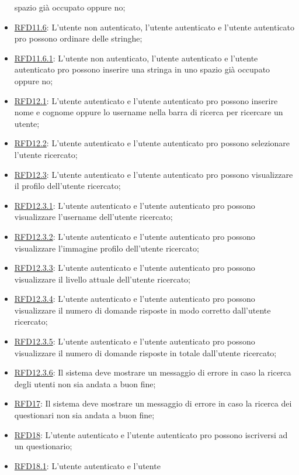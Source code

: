 \begin{itemize}
spazio già occupato oppure no;
\item \hyperlink{RFD11.6}{RFD11.6}: L’utente non autenticato, l’utente
autenticato e l’utente autenticato pro
possono ordinare delle stringhe;
\item \hyperlink{RFD11.6.1}{RFD11.6.1}: L’utente non autenticato, l’utente
autenticato e l’utente autenticato pro
possono inserire una stringa in uno spazio
già occupato oppure no;
\item \hyperlink{RFD12.1}{RFD12.1}: L’utente autenticato e l’utente
autenticato pro possono inserire nome e
cognome oppure lo username nella barra
di ricerca per ricercare un utente;
\item \hyperlink{RFD12.2}{RFD12.2}: L’utente autenticato e l’utente
autenticato pro possono selezionare
l’utente ricercato;
\item \hyperlink{RFD12.3}{RFD12.3}: L’utente autenticato e l’utente
autenticato pro possono visualizzare il profilo dell'utente ricercato;
\item \hyperlink{RFD12.3.1}{RFD12.3.1}: L’utente autenticato e l’utente autenticato pro possono visualizzare l'username dell'utente ricercato;
\item \hyperlink{RFD12.3.2}{RFD12.3.2}: L’utente autenticato e l’utente autenticato pro possono visualizzare l'immagine profilo dell'utente ricercato;
\item \hyperlink{RFD12.3.3}{RFD12.3.3}: L’utente autenticato e l’utente autenticato pro possono visualizzare il livello attuale dell'utente ricercato;
\item \hyperlink{RFD12.3.4}{RFD12.3.4}: L’utente autenticato e l’utente autenticato pro possono visualizzare il numero di domande risposte in modo corretto dall'utente ricercato;
\item \hyperlink{RFD12.3.5}{RFD12.3.5}: L’utente autenticato e l’utente autenticato pro possono visualizzare il numero di domande risposte in totale dall'utente ricercato;
\item \hyperlink{RFD12.3.6}{RFD12.3.6}: Il sistema deve mostrare un messaggio di errore in caso la ricerca degli utenti non sia andata a buon fine;
\item \hyperlink{RFD17}{RFD17}: Il sistema deve mostrare un messaggio di errore in caso la ricerca dei questionari non sia andata a buon fine;
\item \hyperlink{RFD18}{RFD18}: L’utente autenticato e l’utente
autenticato pro possono iscriversi ad un
questionario;
\item \hyperlink{RFD18.1}{RFD18.1}: L’utente autenticato e l’utente

\end{itemize}
